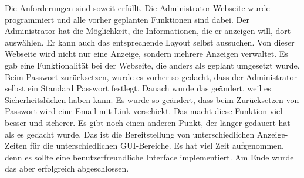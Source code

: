Die Anforderungen sind soweit erfüllt. Die Administrator Webseite wurde programmiert und alle vorher geplanten Funktionen sind dabei. Der Administrator hat die Möglichkeit, die Informationen, die er anzeigen will, dort auswählen. Er kann auch das entsprechende Layout selbst aussuchen. Von dieser Webseite wird nicht nur eine Anzeige, sondern mehrere Anzeigen verwaltet. Es gab eine Funktionalität bei der Webseite, die anders als geplant umgesetzt wurde. Beim Passwort zurücksetzen, wurde es vorher so gedacht, dass der Administrator selbst ein Standard Passwort festlegt. Danach wurde das geändert, weil es Sicherheitslücken haben kann. Es wurde so geändert, dass beim Zurücksetzen von Passwort wird eine Email mit Link verschickt. Das macht diese Funktion viel besser und sicherer. Es gibt noch einen anderen Punkt, der länger gedauert hat als es gedacht wurde. Das ist die Bereitstellung von unterschiedlichen Anzeige-Zeiten für die unterschiedlichen GUI-Bereiche. Es hat viel Zeit aufgenommen, denn es sollte eine benutzerfreundliche Interface implementiert. Am Ende wurde das aber erfolgreich abgeschlossen.
